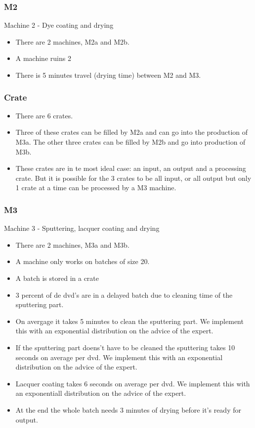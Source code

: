 \documentclass[11pt,a4paper]{article}
\begin{document}
\subsubsection{M2}
Machine 2 - Dye coating and drying
\begin{itemize}
\item  There are 2 machines, M2a and M2b. 
\item A machine ruins 2%
\item  There is 5 minutes travel (drying time) between M2 and M3. 
\end{itemize}

\subsubsection{Crate}
\begin{itemize}
\item There are 6 crates.
\item Three of these crates can be filled by M2a and  can go into the production of M3a. The other three crates can be filled by M2b and go into production of M3b.
\item These crates are in te most ideal case: an input, an output and a processing crate. But it is possible for the 3 crates to be all input, or all output but only 1 crate at a time can be processed by a M3 machine. 

\end{itemize}
\subsubsection{M3}
Machine 3 - Sputtering, lacquer coating and drying
\begin{itemize}
\item There are 2 machines, M3a and M3b. 
\item  A machine only works on batches of size 20.
\item A batch is stored in a crate
\item  3 percent of de dvd's are in a delayed batch due to cleaning time of the sputtering part. 
\item  On avergage it takes 5 minutes to clean the sputtering part.  We implement this with an exponential distribution on the advice of the expert. 
\item If the sputtering part doens't have to be cleaned the sputtering takes 10 seconds on average per dvd. We implement this with an exponential distribution on the advice of the expert. 
\item Lacquer coating takes 6 seconds on average per dvd. We implement this with an exponentiall distribution on the advice of the expert. 
\item At the end the whole batch needs 3 minutes of drying before it's ready for output. 
\end{itemize}
\end{document}
